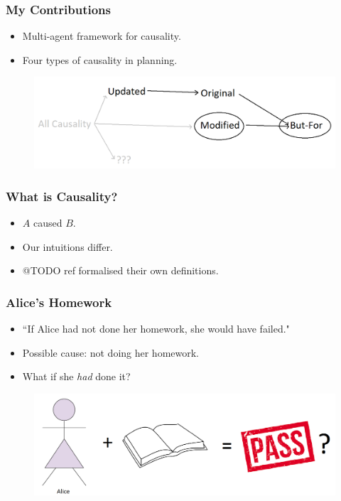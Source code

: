 \documentclass{beamer}
\theoremstyle{plain}
\theoremstyle{definition}
\begin{document}
\begin{frame}
\frametitle{My Contributions}
\begin{itemize}
\item Multi-agent framework for causality.
\item Four types of causality in planning.
\end{itemize}

\begin{figure}
\includegraphics[scale=0.35]{causaldiagram}
\end{figure}
\end{frame}


 
\begin{frame}
\frametitle{What is Causality?}
\begin{itemize}
\item $A$ caused $B$.
\item Our intuitions differ.
\item @TODO ref formalised their own definitions.

\end{itemize}

\end{frame}

\begin{frame}
\frametitle{Alice's Homework}
\begin{itemize}
\item ``If Alice had not done her homework, she would have failed."
\item Possible cause: not doing her homework.
\item What if she \textit{had} done it?
\end{itemize}

\begin{figure}
\includegraphics[scale=0.31]{alicepass}
\end{figure}

\end{frame}
\end{document}
